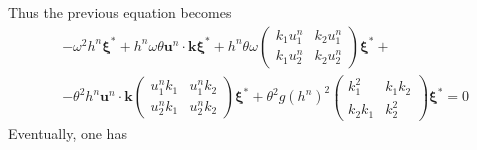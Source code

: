 \documentclass[a4paper, 11pt]{article}
\begin{document}
Thus the previous equation becomes
\begin{equation*}
\begin{split}
&-\omega^2h^n\boldsymbol{\xi}^*+h^n\omega \theta\boldsymbol{u}^n\cdot \boldsymbol{k}\boldsymbol{\xi}^*+h^n\theta\omega \begin{pmatrix}k_1u_1^n&k_2u_1^n\\k_1u_2^n&k_2u_2^n\end{pmatrix}\boldsymbol{\xi}^*+\\
&-\theta^2 h^n\boldsymbol{u}^n\cdot \boldsymbol{k}\begin{pmatrix}u_1^nk_1&u_1^nk_2\\u_2^nk_1&u_2^nk_2\end{pmatrix}
\boldsymbol{\xi}^*+\theta^2g(h^n)^2\begin{pmatrix}k_1^2&k_1k_2\\k_2k_1&k_2^2\end{pmatrix}\boldsymbol{\xi}^*=0
\end{split}
\end{equation*}
Eventually, one has
\end{document}
